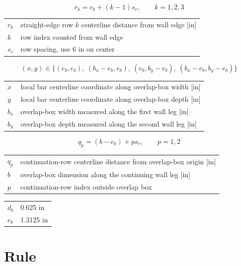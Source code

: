 \documentclass[10pt]{article}
\begin{document}
\begin{equation}
r_k=e_b+(k-1)s_r, \qquad k=1,2,3
\end{equation}

{\ttfamily\footnotesize
\begin{tabular}{@{}ll@{}}
$r_k$ & straight-edge row $k$ centerline distance from wall edge [in] \\
$k$ & row index counted from wall edge \\
$s_r$ & row spacing, use 6 in on center \\
\end{tabular}
}

\begin{equation}
(x,y)\in\{(e_b,e_b),\ (b_x-e_b,e_b),\ (e_b,b_y-e_b),\ (b_x-e_b,b_y-e_b)\}
\end{equation}

{\ttfamily\footnotesize
\begin{tabular}{@{}ll@{}}
$x$ & local bar centerline coordinate along overlap-box width [in] \\
$y$ & local bar centerline coordinate along overlap-box depth [in] \\
$b_x$ & overlap-box width measured along the first wall leg [in] \\
$b_y$ & overlap-box depth measured along the second wall leg [in] \\
\end{tabular}
}

\begin{equation}
q_p=(b-e_b)+ps_r, \qquad p=1,2
\end{equation}

{\ttfamily\footnotesize
\begin{tabular}{@{}ll@{}}
$q_p$ & continuation-row centerline distance from overlap-box origin [in] \\
$b$ & overlap-box dimension along the continuing wall leg [in] \\
$p$ & continuation-row index outside overlap box \\
\end{tabular}
}


{\ttfamily\footnotesize
\begin{tabular}{@{}ll@{}}
$d_b$ & 0.625 in \\
$e_b$ & 1.3125 in \\
\end{tabular}
}

\section{Rule}
\end{document}
